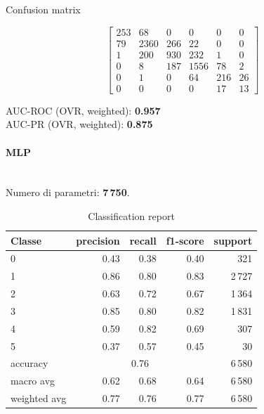 \documentclass[a4paper,12pt]{report}
\begin{document}
	\begin{table}[H]
		\centering
		\caption{Confusion matrix}
		\label{tab:cm_xgb}
		\[
		\begin{bmatrix}
			253 & 68  & 0   & 0   & 0   & 0   \\
			79  & 2360& 266 & 22  & 0   & 0   \\
			1   & 200 & 930 & 232 & 1   & 0   \\
			0   & 8   & 187 & 1556& 78  & 2   \\
			0   & 1   & 0   & 64  & 216 & 26  \\
			0   & 0   & 0   & 0   & 17  & 13
		\end{bmatrix}
		\]
		\vspace{1mm}
		
		AUC-ROC (OVR, weighted): \textbf{0.957} \\
		AUC-PR  (OVR, weighted): \textbf{0.875}
	\end{table}
	
	
	\paragraph{MLP} \mbox{}\\
	Numero di parametri: \textbf{7\,750}.
	
	\begin{table}[H]
		\centering
		\caption{Classification report}
		\label{tab:cr_mlp}
		\begin{tabular}{lrrrr}
			\toprule
			Classe & precision & recall & f1-score & support \\
			\midrule
			0 & 0.43 & 0.38 & 0.40 & 321 \\
			1 & 0.86 & 0.80 & 0.83 & 2\,727 \\
			2 & 0.63 & 0.72 & 0.67 & 1\,364 \\
			3 & 0.85 & 0.80 & 0.82 & 1\,831 \\
			4 & 0.59 & 0.82 & 0.69 & 307 \\
			5 & 0.37 & 0.57 & 0.45 & 30 \\
			\midrule
			accuracy & \multicolumn{3}{c}{0.76} & 6\,580 \\
			macro avg & 0.62 & 0.68 & 0.64 & 6\,580 \\
			weighted avg & 0.77 & 0.76 & 0.77 & 6\,580 \\
			\bottomrule
		\end{tabular}
	\end{table}
	
\end{document}
